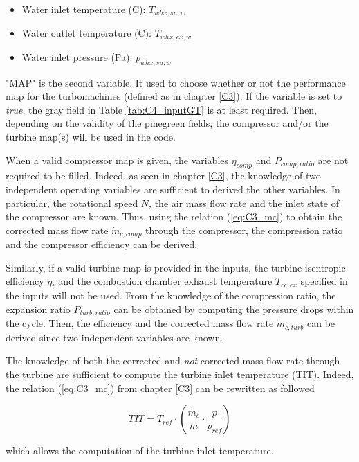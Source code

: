 \begin{itemize}
\item Water inlet temperature (\degree C): $T_{whx,su,w}$
\item Water outlet temperature (\degree C): $T_{whx,ex,w}$
\item Water inlet pressure (Pa): $p_{whx,su,w}$
\end{itemize}

"MAP" is the second variable. It used to choose whether or not the performance map for the turbomachines (defined as in chapter \ref{C3}). If the variable is set to \textit{true}, the {\color{Gray} gray} field in Table \ref{tab:C4_inputGT} is at least required. Then, depending on the validity of the {\color{PineGreen} pinegreen} fields, the compressor and/or the turbine map(s) will be used in the code. 

When a valid compressor map is given, the variables $\eta_{comp}$ and $P_{comp,ratio}$ are not required to be filled. Indeed, as seen in chapter \ref{C3}, the knowledge of two independent operating variables are sufficient to derived the other variables. In particular, the rotational speed $N$, the air mass flow rate and the inlet state of the compressor are known. Thus, using the relation (\ref{eq:C3_mc}) to obtain the corrected mass flow rate $\dot{m}_{c,comp}$ through the compressor, the compression ratio and the compressor efficiency can be derived.  

Similarly, if a valid turbine map is provided in the inputs, the turbine isentropic efficiency $\eta_{t}$ and the combustion chamber exhaust temperature $T_{cc,ex}$ specified in the inputs will not be used. From the knowledge of the compression ratio, the expansion ratio $P_{turb,ratio}$ can be obtained by computing the pressure drops within the cycle. Then, the efficiency and the corrected mass flow rate $\dot{m}_{c,turb}$ can be derived since two independent variables are known.

The knowledge of both the corrected and \textit{not} corrected mass flow rate through the turbine are sufficient to compute the turbine inlet temperature (TIT). Indeed, the relation (\ref{eq:C3_mc}) from chapter \ref{C3} can be rewritten as followed

\begin{equation}
TIT =T_{ref}\cdot \left(\frac{\dot{m}_c}{\dot{m}}\cdot\frac{p}{p_{ref}}\right)
\end{equation} 

which allows the computation of the turbine inlet temperature.
\newpage
